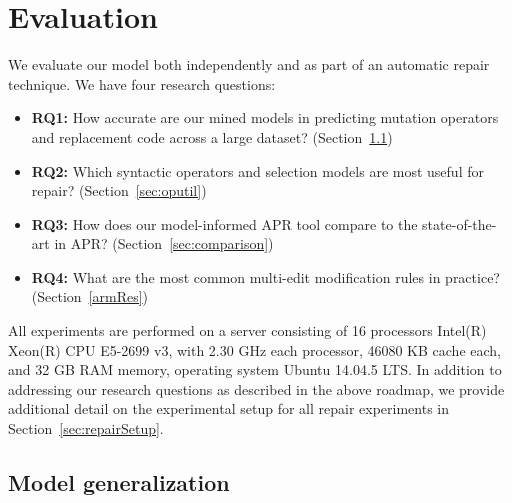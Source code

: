 \documentclass[conference]{IEEEtran}
\newcommand{\todo}[1]
  {{\scriptsize \textbf{\color{red} {#1}}}}
\begin{document}
\section{Evaluation} \label{evaluation}

We evaluate our model both independently and as part of an automatic repair
technique.  We have four research questions:

\begin{itemize}
\item \textbf{RQ1:} How accurate are our mined models in predicting mutation
  operators and replacement code across a large dataset?
(Section~\ref{sec:generalize})
\item \textbf{RQ2:} Which syntactic operators and selection models are most
  useful for repair? (Section~\ref{sec:oputil})
\item \textbf{RQ3:} How does our model-informed APR tool compare to the
    state-of-the-art in APR? (Section~\ref{sec:comparison})
\item \textbf{RQ4:} What are the most common multi-edit modification rules in
    practice? (Section~\ref{armRes})
\end{itemize}


All experiments are performed on a server 
consisting of 16 processors Intel(R) Xeon(R) CPU E5-2699 v3, with 2.30 GHz each
processor, 46080 KB cache each, and 32 GB RAM memory, operating system Ubuntu 
14.04.5 LTS.  In addition to addressing our research questions as described in
the above roadmap, we provide additional detail on the experimental setup for
all repair experiments in Section~\ref{sec:repairSetup}. 

\subsection{Model generalization}
\label{sec:generalize}
  

\end{document}
